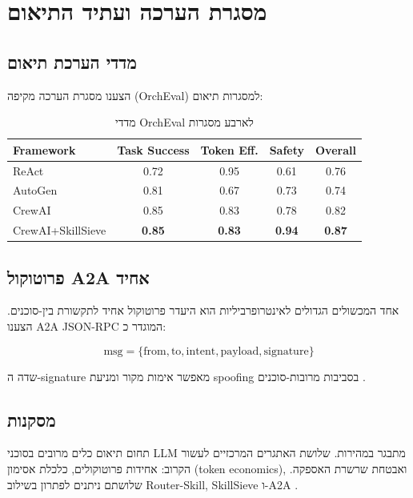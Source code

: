 
\clearpage
\chapter{מסגרת הערכה ועתיד התיאום}

\section{מדדי הערכת תיאום}

הצענו מסגרת הערכה מקיפה (\textenglish{OrchEval}) למסגרות תיאום:

\begin{table}[H]
\centering
\caption{מדדי \textenglish{OrchEval} לארבע מסגרות}
\label{tab:orcheval}
\begin{english}
\begin{tabular}{lcccc}
\toprule
\textbf{Framework} & \textbf{Task Success} & \textbf{Token Eff.} & \textbf{Safety} & \textbf{Overall} \\
\midrule
ReAct           & 0.72 & 0.95 & 0.61 & 0.76 \\
AutoGen         & 0.81 & 0.67 & 0.73 & 0.74 \\
CrewAI          & 0.85 & 0.83 & 0.78 & 0.82 \\
CrewAI+SkillSieve & \textbf{0.85} & \textbf{0.83} & \textbf{0.94} & \textbf{0.87} \\
\bottomrule
\end{tabular}
\end{english}
\end{table}

\section{פרוטוקול \textenglish{A2A} אחיד}

אחד המכשולים הגדולים לאינטרופרביליות הוא היעדר פרוטוקול אחיד לתקשורת בין-סוכנים. הצענו \textenglish{A2A JSON-RPC} המוגדר כ:

\begin{equation}
\text{msg} = \{\text{from}, \text{to}, \text{intent}, \text{payload}, \text{signature}\}
\end{equation}

שדה ה-\textenglish{signature} מאפשר אימות מקור ומניעת \textenglish{spoofing} בסביבות מרובות-סוכנים \cite{nakash2024skillsieve}.

\section{מסקנות}

תחום תיאום כלים מרובים בסוכני \textenglish{LLM} מתבגר במהירות. שלושת האתגרים המרכזיים לעשור הקרוב: אחידות פרוטוקולים, כלכלת אסימון (\textenglish{token economics}), ואבטחת שרשרת האספקה. שלושתם ניתנים לפתרון בשילוב \textenglish{Router-Skill}, \textenglish{SkillSieve} ו-\textenglish{A2A} \cite{yao2022react}.

